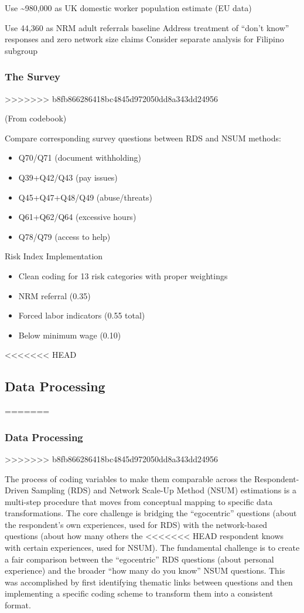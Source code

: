 \documentclass[
  12pt,
  letterpaper,
  DIV=11,
  numbers=noendperiod]{scrartcl}
\providecommand{\tightlist}{%
  \setlength{\itemsep}{0pt}\setlength{\parskip}{0pt}}
\theoremstyle{plain}
\theoremstyle{definition}
\begin{document}
{Use \textasciitilde980,000 as UK domestic worker population estimate (EU
data)

Use 44,360 as NRM adult referrals baseline Address treatment of ``don't
know'' responses and zero network size claims Consider separate analysis
for Filipino subgroup

\subsubsection{The Survey}\label{the-survey}
>>>>>>> b8fb866286418bc4845d972050dd8a343dd24956

(From codebook)

Compare corresponding survey questions between RDS and NSUM methods:

\begin{itemize}
\tightlist
\item
  Q70/Q71 (document withholding)
\item
  Q39+Q42/Q43 (pay issues)
\item
  Q45+Q47+Q48/Q49 (abuse/threats)
\item
  Q61+Q62/Q64 (excessive hours)
\item
  Q78/Q79 (access to help)
\end{itemize}

Risk Index Implementation

\begin{itemize}
\tightlist
\item
  Clean coding for 13 risk categories with proper weightings
\item
  NRM referral (0.35)
\item
  Forced labor indicators (0.55 total)
\item
  Below minimum wage (0.10)
\end{itemize}

<<<<<<< HEAD
\subsection{Data Processing}\label{app-dataprep}
=======
\subsubsection{Data Processing}\label{app-dataprep}
>>>>>>> b8fb866286418bc4845d972050dd8a343dd24956

The process of coding variables to make them comparable across the
Respondent-Driven Sampling (RDS) and Network Scale-Up Method (NSUM)
estimations is a multi-step procedure that moves from conceptual mapping
to specific data transformations. The core challenge is bridging the
``egocentric'' questions (about the respondent's own experiences, used
for RDS) with the network-based questions (about how many others the
<<<<<<< HEAD
respondent knows with certain experiences, used for NSUM). The
fundamental challenge is to create a fair comparison between the
``egocentric'' RDS questions (about personal experience) and the broader
``how many do you know'' NSUM questions. This was accomplished by first
identifying thematic links between questions and then implementing a
specific coding scheme to transform them into a consistent format.

}
\end{document}
